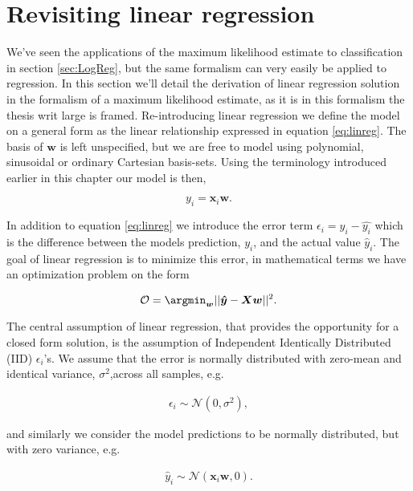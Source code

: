 \section{Revisiting linear regression}

We've seen the applications of the maximum likelihood estimate to classification in section \ref{sec:LogReg}, but the same formalism can very easily be applied to regression. In this section we'll detail the derivation of linear regression solution in the formalism of a maximum likelihood estimate, as it is in this formalism the thesis writ large is framed. Re-introducing linear regression we define the model on a general form as the linear relationship expressed in equation \ref{eq:linreg}. The basis of $\boldsymbol{w}$ is left unspecified, but we are free to model using polynomial, sinusoidal or ordinary Cartesian basis-sets. Using the terminology introduced earlier in this chapter our model is then, 

\begin{equation}\label{eq:linreg}
y_i = \boldsymbol{x}_i\boldsymbol{w}.
\end{equation}

\noindent In addition to equation \ref{eq:linreg} we introduce the error term $\epsilon_i= y_i - \hat{y_i}$ which is the difference between the models prediction, $y_i$, and the actual value $\hat{y}_i$. The goal of linear regression is to minimize this error, in mathematical terms we have an optimization problem on the form

\begin{equation}
\mathcal{O} = \argmin _{\boldsymbol{w}} || \boldsymbol{\hat{y}} - \boldsymbol{Xw} ||^2.
\end{equation}

\noindent The central assumption of linear regression, that provides the opportunity for a closed form solution, is the assumption of Independent Identically Distributed (IID) $\epsilon_i$'s. We assume that the error is normally distributed with zero-mean and identical variance, $\sigma^2$,across all samples, e.g. 

\begin{align}
\epsilon_i \sim \mathcal{N}(0, \sigma^2),
\end{align}

\noindent and similarly we consider the model predictions to be normally distributed, but with zero variance, e.g.

\begin{align}
\hat{y}_i \sim \mathcal{N}(\boldsymbol{x}_i\boldsymbol{w}, 0).
\end{align}

